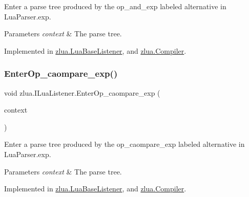 Enter a parse tree produced by the {\ttfamily op\+\_\+and\+\_\+exp} labeled alternative in Lua\+Parser.\+exp. 


\begin{DoxyParams}{Parameters}
{\em context} & The parse tree.\\
\hline
\end{DoxyParams}


Implemented in \mbox{\hyperlink{classzlua_1_1_lua_base_listener_ace41c3066a31697b1bda64251528030b}{zlua.\+Lua\+Base\+Listener}}, and \mbox{\hyperlink{classzlua_1_1_compiler_a057cdeaef67ecf5a4d53ea10833b3d24}{zlua.\+Compiler}}.

\mbox{\label{interfacezlua_1_1_i_lua_listener_a15745713dc5965a0337698761f16947d}} 
\subsubsection{\texorpdfstring{Enter\+Op\+\_\+caompare\+\_\+exp()}{EnterOp\_caompare\_exp()}}
{\footnotesize\ttfamily void zlua.\+I\+Lua\+Listener.\+Enter\+Op\+\_\+caompare\+\_\+exp (\begin{DoxyParamCaption}\item[{\mbox{[}\+Not\+Null\mbox{]} \mbox{\hyperlink{classzlua_1_1_lua_parser_1_1_op__caompare__exp_context}{Lua\+Parser.\+Op\+\_\+caompare\+\_\+exp\+Context}}}]{context }\end{DoxyParamCaption})}



Enter a parse tree produced by the {\ttfamily op\+\_\+caompare\+\_\+exp} labeled alternative in Lua\+Parser.\+exp. 


\begin{DoxyParams}{Parameters}
{\em context} & The parse tree.\\
\hline
\end{DoxyParams}


Implemented in \mbox{\hyperlink{classzlua_1_1_lua_base_listener_a9882ebd74c5ae33d72487bddb4f960ec}{zlua.\+Lua\+Base\+Listener}}, and \mbox{\hyperlink{classzlua_1_1_compiler_a3ee6eb43c518439f5e6df2496d4bd45f}{zlua.\+Compiler}}.

\mbox{\label{interfacezlua_1_1_i_lua_listener_acbbb173b8111f78841067f364c764c2c}} 
